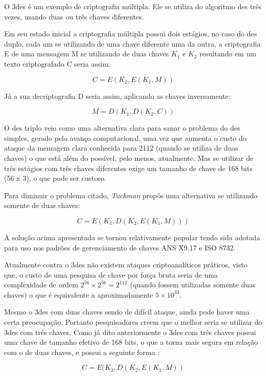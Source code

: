 O \acrfull{3des} é um exemplo de criptografia múltipla. Ele se utiliza do algoritmo \acrshort{des} três vezes, usando duas ou três chaves diferentes.

Em seu estado inicial a criptografia múltipla possui dois estágios, no caso do \acrshort{des} duplo, cada um se utilizando de uma chave diferente uma da outra, a criptografia E de uma mensagem M se utilizando de duas chaves \(K_1\) e \(K_2\) resultando em um texto criptografado C seria assim:

\[C = E(K_2, E(K_1, M))\]

Já a sua decriptografia D seria assim, aplicando as chaves inversamente:

\[M = D(K_1, D(K_2, C))\]

O \acrshort{des} triplo veio como uma alternativa clara para sanar o problema do \acrshort{des} simples, gerado pelo avanço computacional, uma vez que aumenta o custo do ataque da mensagem clara conhecida para 2112 (quando se utiliza de duas chaves) o que está além do possível, pelo menos, atualmente. Mas se utilizar de três estágios com três chaves diferentes exige um tamanho de chave de 168 bits (56 x 3), o que pode ser custoso.

Para diminuir o problema citado, \textit{Tuchman} propôs uma alternativa se utilizando somente de duas chaves:

\[C = E(K_1, D(K_2, E(K_1, M)))\]

A solução acima apresentada se tornou relativamente popular tendo sida adotada para uso nos padrões de gerenciamento de chaves ANS X9.17 e ISO 8732.

Atualmente contra o \acrshort{3des} não existem ataques criptoanalíticos práticos, visto que, o custo de uma pesquisa de chave por força bruta seria de uma complexidade de ordem \(2^{56} \times 2^{56} = 2^{112}\) (quando fossem utilizadas somente duas chaves) o que é equivalente a aproximadamente \(5 \times 10^{33}\).

Mesmo o \acrshort{3des} com duas chaves sendo de difícil ataque, ainda pode haver uma certa preocupação. Portanto pesquisadores creem que o melhor seria se utilizar do \acrshort{3des} com três chaves. Como já dito anteriormente o \acrshort{3des} com três chaves possui uma chave de tamanho efetivo de 168 bits, o que a torna mais segura em relação com o de duas chaves, e possui a seguinte forma \cite{stallings14}:

\[C = E(K_3, D(K_2, E(K_1, M))\]

